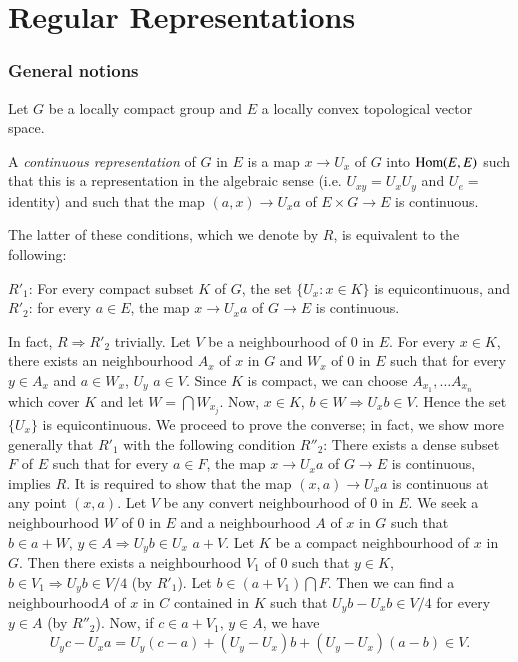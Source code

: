 
\chapter{Regular Representations}\label{partII-chap4}

\setcounter{section}{4}
\setcounter{subsection}{0}
\subsection{General
  notions}\label{partII-chap4-sec4.1}\pageoriginale%

Let $G$ be a locally compact group and $E$ a locally convex
topological vector space. 

\begin{defi*} %
 A {\em continuous representation} of $G$ in $E$ is a map $x\rightarrow U_x$
 of $G$ into $\operatorname{Hom} (E,E)$ such that this is a representation in the
 algebraic sense (i.e. $U_{xy}= U _x  U_y$ and   $U_e =$ identity)
 and such that the map $(a,x)\rightarrow U_xa$ of $E\times G
 \rightarrow E$ is continuous. 
\end{defi*}

The latter of these conditions, which we denote by $R$, is equivalent
to the following: 

$R'_1$: For every compact subset $K$ of $G$, the set $\{U_x :
x \in K\}$ is equicontinuous, and $R'_2$: for every $a\in E$, the
map $x \rightarrow U_xa$  of $G \rightarrow E$ is continuous. 

In fact, $R \Rightarrow R'_2$ trivially. Let $V$ be a neighbourhood
of $0$ in $E$.  For every $x\in K$, there exists an neighbourhood $A_x$
of $x$ in $G$ and $W_x$  of $0$ in $E$ such that for every $y\in A_x$
and $ a\in W_x$, $U_y$ $a \in V$. Since $K$ is compact, we can choose
$A_{x_1},\ldots A_{x_n}$ which cover $K$ and let $W =\bigcap
W_{x_j}$. Now, $x\in K$, $b\in W \Rightarrow U_x b\in V$. Hence the set
$\{ U_x\}$ is equicontinuous. We proceed to prove the
converse; in fact, we show more generally that $R'_1$ with the
following condition $R''_2$: There exists a dense subset $F$ of $E$
such that for every $a \in F$, the map $x\rightarrow U_x a$ of
$G\rightarrow E$ is continuous, implies $R$. It is required to show
that the map $(x,a)\rightarrow U_x a$ is continuous at any point
$(x,a)$. Let $V$ be any convert neighbourhood of $0$ in $E$. We seek a
neighbourhood $W$ of $0$ in $E$ and a neighbourhood $A$ of $x$ in $G$
such that $b\in a + W$, $y\in A\Rightarrow U_y b\in U_x$ $a
+ V$. Let $K$ be a compact neighbourhood of $x$ in $G$. Then there
exists a neighbourhood $V_1$  of $0$ such that $y\in K$, $b\in V_1
\Rightarrow U_y b\in V/4$ (by $R'_1$). Let $b \in (a+V_1) \bigcap
F$. Then we can find a   
neighbourhood\pageoriginale $A$ of $x$ in $C$ contained in $K$ such
that $U_yb - U_xb\in V/4$ for every $y \in A$ (by $R''_2$). Now, if $c \in
a+V_1$, $y \in A$, we have  
$$ 
U_yc - U_xa = U_y (c-a) + (U_y-U_x)b + (U_y - U_x)(a-b) \in V. 
$$ 

